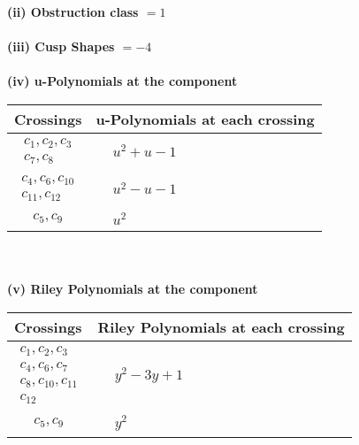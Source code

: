 \documentclass[1p]{elsarticle_modified}
\theoremstyle{definition}
\begin{document}
\flushleft \textbf{(ii) Obstruction class $= 1$}\\~\\
\flushleft \textbf{(iii) Cusp Shapes $= -4$}\\~\\
\newpage\renewcommand{\arraystretch}{1}
\flushleft \textbf{(iv) u-Polynomials at the component}\newline \\
\begin{tabular}{m{50pt}|m{274pt}}
Crossings & \hspace{64pt}u-Polynomials at each crossing \\
\hline $$\begin{aligned}c_{1},c_{2},c_{3}\\c_{7},c_{8}\end{aligned}$$&$\begin{aligned}
&u^2+u-1
\end{aligned}$\\
\hline $$\begin{aligned}c_{4},c_{6},c_{10}\\c_{11},c_{12}\end{aligned}$$&$\begin{aligned}
&u^2- u-1
\end{aligned}$\\
\hline $$\begin{aligned}c_{5},c_{9}\end{aligned}$$&$\begin{aligned}
&u^2
\end{aligned}$\\
\hline
\end{tabular}\\~\\
\newpage\renewcommand{\arraystretch}{1}
\flushleft \textbf{(v) Riley Polynomials at the component}\newline \\
\begin{tabular}{m{50pt}|m{274pt}}
Crossings & \hspace{64pt}Riley Polynomials at each crossing \\
\hline $$\begin{aligned}c_{1},c_{2},c_{3}\\c_{4},c_{6},c_{7}\\c_{8},c_{10},c_{11}\\c_{12}\end{aligned}$$&$\begin{aligned}
&y^2-3 y+1
\end{aligned}$\\
\hline $$\begin{aligned}c_{5},c_{9}\end{aligned}$$&$\begin{aligned}
&y^2
\end{aligned}$\\
\hline
\end{tabular}\\~\\
\end{document}
